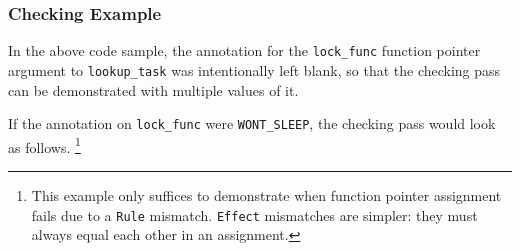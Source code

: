 \documentclass{article}
\begin{document}
\subsubsection{Checking Example}

In the above code sample, the annotation for the \texttt{lock\_func} function pointer argument to \texttt{lookup\_task} was intentionally left blank, so that the checking pass can be demonstrated with multiple values of it.

If the annotation on \texttt{lock\_func} were \texttt{WONT\_SLEEP}, the checking pass would look as follows.
\footnote{This example only suffices to demonstrate when function pointer assignment fails due to a \texttt{Rule} mismatch. \texttt{Effect} mismatches are simpler: they must always equal each other in an assignment.}
\end{document}
